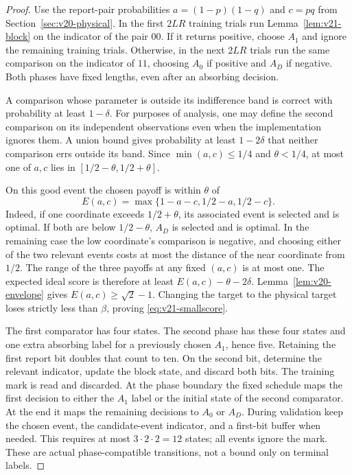 \begin{proof}
Use the report-pair probabilities $a=(1-p)(1-q)$ and $c=pq$ from
Section~\ref{sec:v20-physical}. In the first $2LR$ training trials run
Lemma~\ref{lem:v21-block} on the indicator of the pair $00$. If it
returns positive, choose $A_1$ and ignore the remaining training trials.
Otherwise, in the next $2LR$ trials run the same comparison on the
indicator of $11$, choosing $A_0$ if positive and $A_D$ if negative.
Both phases have fixed lengths, even after an absorbing decision.

A comparison whose parameter is outside its indifference band is
correct with probability at least $1-\delta$. For purposes of analysis,
one may define the second comparison on its independent observations
even when the implementation ignores them. A union bound gives
probability at least $1-2\delta$ that neither comparison errs outside
its band. Since $\min(a,c)\le1/4$ and $\theta<1/4$, at most one of
$a,c$ lies in $[1/2-\theta,1/2+\theta]$.

On this good event the chosen payoff is within $\theta$ of
\[
 E(a,c)=\max\{1-a-c,1/2-a,1/2-c\}.
\]
Indeed, if one coordinate exceeds $1/2+\theta$, its associated event
is selected and is optimal. If both are below $1/2-\theta$, $A_D$ is
selected and is optimal. In the remaining case the low coordinate's
comparison is negative, and choosing either of the two relevant events
costs at most the distance of the near coordinate from $1/2$.
The range of the three payoffs at any fixed $(a,c)$ is at most one.
The expected ideal score is therefore at least
$E(a,c)-\theta-2\delta$. Lemma~\ref{lem:v20-envelope} gives
$E(a,c)\ge\sqrt2-1$. Changing the target to the physical target loses
strictly less than $\beta$, proving \eqref{eq:v21-smallscore}.

The first comparator has four states. The second phase has these four
states and one extra absorbing label for a previously chosen $A_1$,
hence five. Retaining the first report bit doubles that count to ten.
On the second bit, determine the relevant indicator, update the block
state, and discard both bits. The training mark is read and discarded.
At the phase boundary the fixed schedule maps the first decision to
either the $A_1$ label or the initial state of the second comparator.
At the end it maps the remaining decisions to $A_0$ or $A_D$.
During validation keep the chosen event, the candidate-event indicator,
and a first-bit buffer when needed. This requires at most
$3\cdot2\cdot2=12$ states; all events ignore the mark. These are actual
phase-compatible transitions, not a bound only on terminal labels.


\end{proof}
